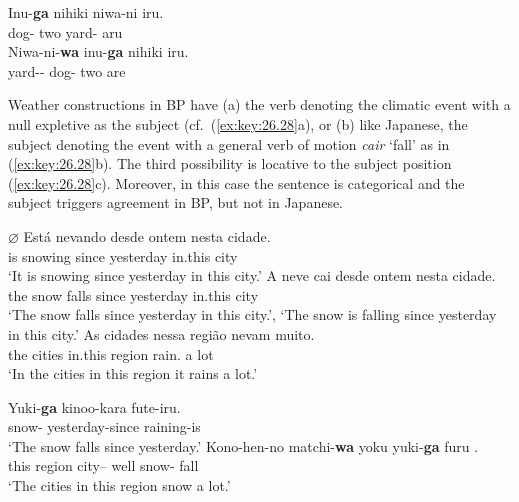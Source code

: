 \documentclass[output=paper]{langsci/langscibook}
\begin{document}
\ea%
    \label{ex:key:26.27}
    \ea
    \gll    Inu-\textbf{ga} nihiki  niwa-ni iru.\\
            dog-\Nom{}  two yard-\Loc{} aru\\
    \ex
    \gll    Niwa-ni-\textbf{wa} inu-\textbf{ga} nihiki iru.\\
            yard-\Loc{}-\Topic{} dog-\Nom{} two are\\
    \z
\z

Weather constructions in \gls{BP} have (a) the verb
denoting the climatic event with a null expletive as the subject  (cf.\
(\ref{ex:key:26.28}a), or  (b) like Japanese, the subject denoting  the event
with a general verb of motion \emph{cair} \enquote*{fall} as in
(\ref{ex:key:26.28}b).  The third possibility is locative  to the
subject position (\ref{ex:key:26.28}c).  Moreover, in this case the sentence is
categorical and the subject triggers agreement in \gls{BP}\il{Brazilian
Portuguese}, but not in Japanese.

\ea%
    \label{ex:key:26.28}
    \ea
	\gll	$\varnothing$ Está nevando  desde ontem nesta cidade.\\
			{} is  snowing    since yesterday in.this city\\
	\glt	\enquote*{It is snowing since yesterday in this city.}
    \ex
	\gll	A neve   cai   desde ontem   nesta cidade.\\
			the snow falls since yesterday in.this city\\
	\glt	\enquote*{The snow falls since yesterday in this city.}, \enquote*{The snow is falling since yesterday in this city.}
    \ex
	\gll	As cidades nessa região nevam muito.\\
            the cities    in.this region  rain.\Tpl{} {a lot}\\
	\glt	\enquote*{In the cities in this region it rains a lot.}
    \z
\z

\ea%
    \label{ex:key:26.29}
    \ea
	\gll	Yuki-\textbf{ga}   kinoo-kara         fute-iru.\\
            snow-\Nom{} yesterday-since  raining-is\\
	\glt	\enquote*{The snow falls since yesterday.}
    \ex
	\gll	Kono-hen-no matchi-\textbf{wa}  yoku yuki-\textbf{ga}      furu .\\
            {this region} city–\Topic{} well snow-\Nom{}  fall\\
	\glt	\enquote*{The cities in this region snow a lot.}
    \z
\z
\end{document}
